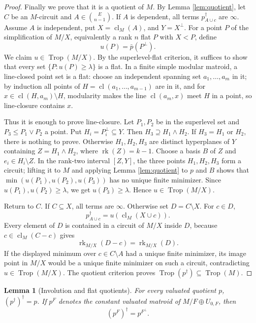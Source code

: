 \documentclass[12pt]{article}
\newtheorem{lemma}[theorem]{Lemma}
\theoremstyle{definition}
\newcommand{\Trop}{\operatorname{Trop}}
\newcommand{\rk}{\operatorname{rk}}
\newcommand{\cl}{\operatorname{cl}}
\newcommand{\binomE}[1]{\binom{E}{#1}}
\begin{document}
\begin{proof}
Finally we prove that it is a quotient of \(M\).  By Lemma \ref{lem:quotient}, let \(C\) be an \(M\)-circuit and \(A\in\binomE{n-1}\).  If \(A\) is dependent, all terms \(p^\dagger_{A\cup c}\) are \(\infty\).  Assume \(A\) is independent, put \(X=\cl_M(A)\), and \(Y=X^\perp\).  For a point \(P\) of the simplification of \(M/X\), equivalently a rank \(n\) flat \(P\) with \(X<P\), define
\[
u(P)=\bar p(P^\perp).
\]
We claim \(u\in\Trop(M/X)\).  By the superlevel-flat criterion, it suffices to show that every set \(\{P:u(P)\ge\lambda\}\) is a flat.  In a finite simple modular matroid, a line-closed point set is a flat: choose an independent spanning set \(a_1,\ldots,a_m\) in it; by induction all points of \(H=\cl(a_1,\ldots,a_{m-1})\) are in it, and for \(x\in\cl(H,a_m)\setminus H\), modularity makes the line \(\cl(a_m,x)\) meet \(H\) in a point, so line-closure contains \(x\).

Thus it is enough to prove line-closure.  Let \(P_1,P_2\) be in the superlevel set and \(P_3\le P_1\vee P_2\) a point.  Put \(H_i=P_i^\perp\subseteq Y\).  Then \(H_3\supseteq H_1\wedge H_2\).  If \(H_3=H_1\) or \(H_2\), there is nothing to prove.  Otherwise \(H_1,H_2,H_3\) are distinct hyperplanes of \(Y\) containing \(Z=H_1\wedge H_2\), where \(\rk(Z)=k-1\).  Choose a basis \(B\) of \(Z\) and \(e_i\in H_i\setminus Z\).  In the rank-two interval \([Z,Y]\), the three points \(H_1,H_2,H_3\) form a circuit; lifting it to \(M\) and applying Lemma \ref{lem:quotient} to \(p\) and \(B\) shows that \(\min(u(P_1),u(P_2),u(P_3))\) has no unique finite minimizer.  Since \(u(P_1),u(P_2)\ge\lambda\), we get \(u(P_3)\ge\lambda\).  Hence \(u\in\Trop(M/X)\).

Return to \(C\).  If \(C\subseteq X\), all terms are \(\infty\).  Otherwise set \(D=C\setminus X\).  For \(c\in D\),
\[
p^\dagger_{A\cup c}=u(\cl_M(X\cup c)).
\]
Every element of \(D\) is contained in a circuit of \(M/X\) inside \(D\), because \(c\in\cl_M(C-c)\) gives
\[
\rk_{M/X}(D-c)=\rk_{M/X}(D).
\]
If the displayed minimum over \(c\in C\setminus A\) had a unique finite minimizer, its image point in \(M/X\) would be a unique finite minimizer on such a circuit, contradicting \(u\in\Trop(M/X)\).  The quotient criterion proves \(\Trop(p^\dagger)\subseteq\Trop(M)\).
\end{proof}

\begin{lemma}[Involution and flat quotients]\label{lem:invflat}
For every valuated quotient \(p\), \((p^\dagger)^\dagger=p\).  If \(p^F\) denotes the constant valuated matroid of \(M/F\oplus U_{0,F}\), then
\[
(p^F)^\dagger=p^{F^\perp}.
\]
\end{lemma}
\end{document}
